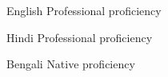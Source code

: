 
\begin{cvskills}

  \cvskill
    {English} %
    {Professional proficiency} %

  \cvskill
    {Hindi} %
    {Professional proficiency} %

  \cvskill
    {Bengali} %
    {Native proficiency} %
    
\end{cvskills}
